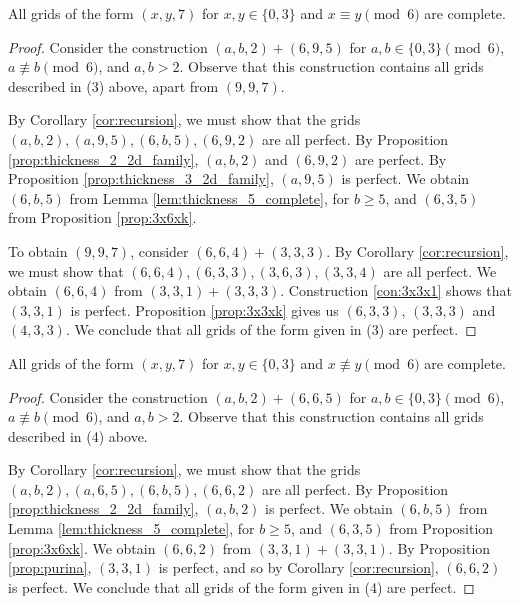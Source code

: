 \begin{lem}
\label{lem:thickness_7_case_3}
All grids of the form $(x,y,7)$ for $x,y \in \{0,3\}$ and $x \equiv y \pmod 6$ are complete.
\end{lem}

\begin{proof}
Consider the construction $(a,b,2) + (6,9,5)$ for $a,b \in \{0,3\} \pmod 6$, $a \not\equiv b \pmod 6$, and $a,b > 2$. Observe that this construction contains all grids described in (3) above, apart from $(9,9,7)$. 

By Corollary \ref{cor:recursion}, we must show that the grids $(a,b,2), (a,9,5), (6,b,5), (6,9,2)$ are all perfect. By Proposition \ref{prop:thickness_2_2d_family}, $(a,b,2)$ and $(6,9,2)$ are perfect. By Proposition \ref{prop:thickness_3_2d_family}, $(a,9,5)$ is perfect. We obtain $(6,b,5)$ from Lemma \ref{lem:thickness_5_complete}, for $b \geq 5$, and $(6,3,5)$ from Proposition \ref{prop:3x6xk}. 

To obtain $(9,9,7)$, consider $(6,6,4) + (3,3,3)$. By Corollary \ref{cor:recursion}, we must show that $(6,6,4), (6,3,3), (3,6,3), (3,3,4)$ are all perfect. We obtain $(6,6,4)$ from $(3,3,1) + (3,3,3)$. Construction \ref{con:3x3x1} shows that $(3,3,1)$ is perfect. Proposition \ref{prop:3x3xk} gives us $(6,3,3)$, $(3,3,3)$ and $(4,3,3)$. We conclude that all grids of the form given in (3) are perfect.
\end{proof}

\begin{lem}
\label{lem:thickness_7_case_4}
All grids of the form $(x,y,7)$ for $x,y \in \{0,3\}$ and $x \not\equiv y \pmod 6$ are complete.
\end{lem}

\begin{proof}
Consider the construction $(a,b,2) + (6,6,5)$ for $a,b \in \{0,3\} \pmod 6$, $a \not\equiv b \pmod 6$, and $a,b > 2$. Observe that this construction contains all grids described in (4) above. 

By Corollary \ref{cor:recursion}, we must show that the grids $(a,b,2), (a,6,5), (6,b,5), (6,6,2)$ are all perfect. By Proposition \ref{prop:thickness_2_2d_family}, $(a,b,2)$ is perfect. We obtain $(6,b,5)$ from Lemma \ref{lem:thickness_5_complete}, for $b \geq 5$, and $(6,3,5)$ from Proposition \ref{prop:3x6xk}. We obtain $(6,6,2)$ from $(3,3,1)+(3,3,1)$. By Proposition \ref{prop:purina}, $(3,3,1)$ is perfect, and so by Corollary \ref{cor:recursion}, $(6,6,2)$ is perfect. We conclude that all grids of the form given in (4) are perfect.
\end{proof}

